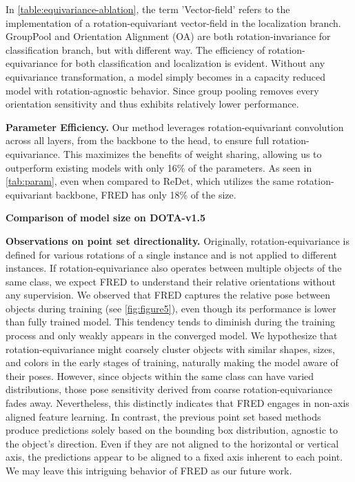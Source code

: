 \documentclass[letterpaper]{article} %
\begin{document}
In \cref{table:equivariance-ablation}, the term 'Vector-field' refers to the implementation of a rotation-equivariant vector-field in the localization branch. GroupPool and Orientation Alignment (OA) are both rotation-invariance for classification branch, but with different way. The efficiency of rotation-equivariance for both classification and localization is evident. Without any equivariance transformation, a model simply becomes in a capacity reduced model with rotation-agnostic behavior. Since group pooling removes every orientation sensitivity and thus exhibits relatively lower performance.

\noindent\textbf{Parameter Efficiency.} Our method leverages rotation-equivariant convolution across all layers, from the backbone to the head, to ensure full rotation-equivariance. This maximizes the benefits of weight sharing, allowing us to outperform existing models with only 16\% of the parameters. As seen in \cref{tab:param}, even when compared to ReDet, which utilizes the same rotation-equivariant backbone, FRED has only 18\% of the size.





\begin{table}[t]
   
    \caption{\textbf{Comparison of model size on DOTA-v1.5}}
   \label{tab:param}
\end{table}

\noindent\textbf{Observations on point set directionality.} Originally, rotation-equivariance is defined for various rotations of a single instance and is not applied to different instances. If rotation-equivariance also operates between multiple objects of the same class, we expect FRED to understand their relative orientations without any supervision. We observed that FRED captures the relative pose between objects during training (see \cref{fig:figure5}), even though its performance is lower than fully trained model. This tendency tends to diminish during the training process and only weakly appears in the converged model. We hypothesize that rotation-equivariance might coarsely cluster objects with similar shapes, sizes, and colors in the early stages of training, naturally making the model aware of their poses. However, since objects within the same class can have varied distributions, those pose sensitivity derived from coarse rotation-equivariance fades away. Nevertheless, this distinctly indicates that FRED engages in non-axis aligned feature learning. In contrast, the previous point set based methods produce predictions solely based on the bounding box distribution, agnostic to the object's direction. Even if they are not aligned to the horizontal or vertical axis, the predictions appear to be aligned to a fixed axis inherent to each point. We may leave this intriguing behavior of FRED as our future work.
\end{document}
